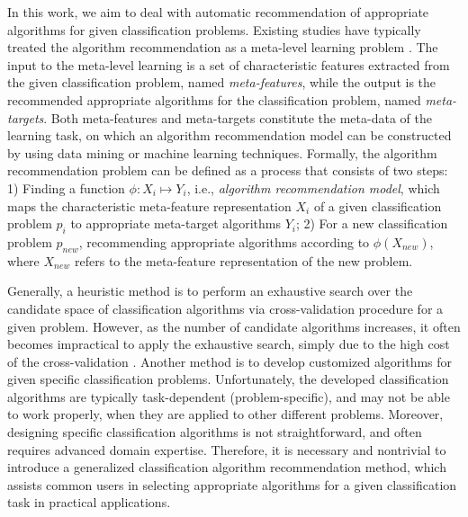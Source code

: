 \documentclass[prodmode,acmtkdd]{acmsmall}
\begin{document}
In this work, we aim to deal with automatic recommendation of appropriate algorithms for given classification problems.
Existing studies have typically treated the algorithm recommendation as a meta-level learning problem \cite{rice1975algorithm,smith2008cross}.
The input to the meta-level learning is a set of characteristic features extracted from the given classification problem, named \textit{meta-features},
while the output is the recommended appropriate algorithms for the classification problem, named \textit{meta-targets}.
Both meta-features and meta-targets constitute the meta-data of the learning task,
on which an algorithm recommendation model can be constructed by using data mining or machine learning techniques.
Formally,
the algorithm recommendation problem can be defined as a process that consists of two steps:
1) Finding a function $\phi: X_i \mapsto Y_i$, i.e., \textit{algorithm recommendation model},
which maps the characteristic meta-feature representation $X_i$ of a given classification problem $p_i$ to appropriate meta-target algorithms $Y_i$;
2) For a new classification problem $p_{new}$, recommending appropriate algorithms according to $\phi(X_{new})$, where $X_{new}$ refers to the meta-feature representation of the new problem.







Generally,
a heuristic method is to perform an exhaustive search over the candidate space of classification algorithms via cross-validation procedure for a given problem.
However, as the number of candidate algorithms increases, it often becomes impractical to apply the exhaustive search,
simply due to the high cost of the cross-validation \cite{song2012automatic}.
Another method is to develop customized algorithms for given specific classification problems.
Unfortunately,
the developed classification algorithms are typically task-dependent (problem-specific), and may not be able to work properly, when they are applied to other different problems.
Moreover, designing specific classification algorithms is not straightforward, and often requires advanced domain expertise.
Therefore, it is necessary and nontrivial to introduce a generalized classification algorithm recommendation method,
which assists common users in selecting appropriate algorithms for a given classification task in practical applications.
\end{document}
